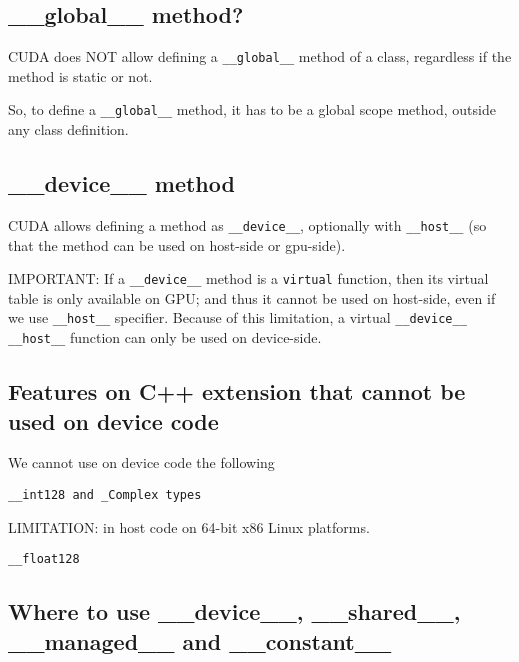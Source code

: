 \subsection{\_\_global\_\_ method?}

CUDA does NOT allow defining a \verb!__global__! method of a class, regardless if the method is static or not.

So, to define a \verb!__global__! method, it has to be a global scope method, outside any class definition.

\subsection{\_\_device\_\_ method}

CUDA allows defining a method as \verb!__device__!, optionally with
\verb!__host__! (so that the method can be used on host-side or gpu-side).

IMPORTANT: If a \verb!__device__! method is a \verb!virtual! function, then its
virtual table is only available on GPU; and thus it cannot be used on host-side,
even if we use \verb!__host__! specifier. Because of this limitation, a virtual
\verb!__device__! \verb!__host__! function can only be used on device-side.


\subsection{Features on C++ extension that cannot be used on device code}


We cannot use on device code the following
\begin{verbatim}
__int128 and _Complex types
\end{verbatim}

LIMITATION: in host code on 64-bit x86 Linux platforms.
\begin{verbatim}
__float128
\end{verbatim}

\subsection{Where to use \_\_device\_\_, \_\_shared\_\_, \_\_managed\_\_ and \_\_constant\_\_ }


